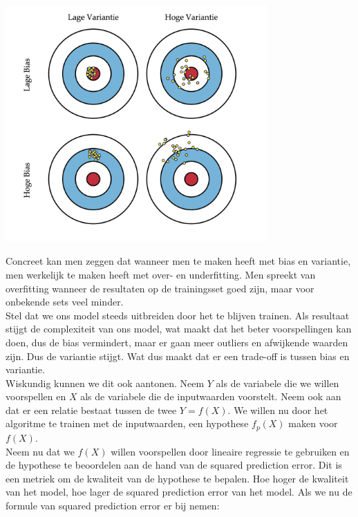 \begin{center}
  \includegraphics[width=10cm]{bulls-eye}
\end{center}
\newline
Concreet kan men zeggen dat wanneer men te maken heeft met bias en variantie, men werkelijk te maken heeft met over- en underfitting. Men spreekt van overfitting wanneer de resultaten op de trainingsset goed zijn, maar voor onbekende sets veel minder.\\
Stel dat we ons model steeds uitbreiden door het te blijven trainen. Als resultaat stijgt de complexiteit van ons model, wat maakt dat het beter voorspellingen kan doen, dus de bias vermindert, maar er gaan meer outliers en afwijkende waarden zijn. Dus de variantie stijgt. Wat dus maakt dat er een trade-off is tussen bias en variantie.\\ 
%
Wiskundig kunnen we dit ook aantonen. Neem $Y$ als de variabele die we willen voorspellen en $X$ als de variabele die de inputwaarden voorstelt. Neem ook aan dat er een relatie bestaat tussen de twee $Y=f(X)$. We willen nu door het algoritme te trainen met de inputwaarden, een hypothese $f_{p}(X)$ maken voor $f(X)$. \\
Neem nu dat we $f(X)$ willen voorspellen door lineaire regressie te gebruiken en de hypothese te beoordelen aan de hand van de squared prediction error. Dit is een metriek om de kwaliteit van de hypothese te bepalen. Hoe hoger de kwaliteit van het model, hoe lager de squared prediction error van het model. Als we nu de formule van squared prediction error er bij nemen:

